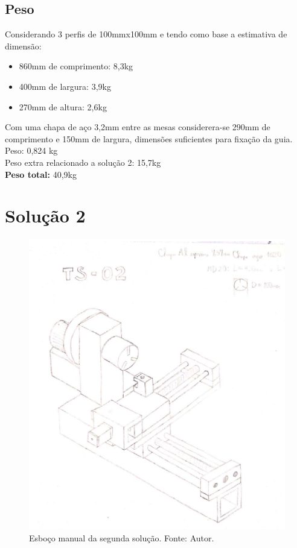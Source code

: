 \subsection{Peso}

Considerando 3 perfis de 100mmx100mm e tendo como base a estimativa de dimensão: \\
\begin{itemize}
    \item 860mm de comprimento: 8,3kg
    \item 400mm de largura: 3,9kg
    \item 270mm de altura: 2,6kg
\end{itemize}

Com uma chapa de aço 3,2mm entre as mesas considerera-se 290mm de comprimento e 150mm de largura, dimensões suficientes para fixação da guia.  \\
Peso: 0,824 kg \\

Peso extra relacionado a solução 2: 15,7kg \\

\textbf{Peso total:} 40,9kg


\section{Solução 2}

\begin{figure}[h!]
    \centering
    \includegraphics[width=0.7\linewidth]{images/sol2.png}
    \caption{Esboço manual da segunda solução. Fonte: Autor.}
    \label{fig:enter-label}
\end{figure}

